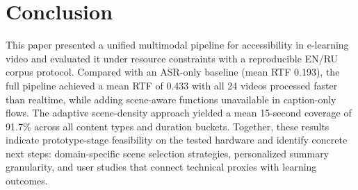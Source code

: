 \documentclass[conference]{IEEEtran}
\begin{document}
\section{Conclusion}
This paper presented a unified multimodal pipeline for accessibility in e-learning video and evaluated it under resource constraints with a reproducible EN/RU corpus protocol. Compared with an ASR-only baseline (mean RTF 0.193), the full pipeline achieved a mean RTF of 0.433 with all 24 videos processed faster than realtime, while adding scene-aware functions unavailable in caption-only flows. The adaptive scene-density approach yielded a mean 15-second coverage of 91.7\% across all content types and duration buckets. Together, these results indicate prototype-stage feasibility on the tested hardware and identify concrete next steps: domain-specific scene selection strategies, personalized summary granularity, and user studies that connect technical proxies with learning outcomes.



\end{document}

